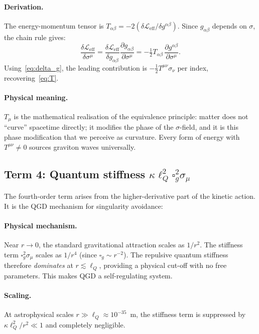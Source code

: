 \documentclass[11pt,a4paper]{article}
\theoremstyle{plain}
\theoremstyle{definition}
\theoremstyle{remark}
\newcommand{\lQ}{\ell_Q}
\newcommand{\boxg}{\square_g}
\newcommand{\half}{\tfrac{1}{2}}
\begin{document}
\paragraph{Derivation.}
The energy-momentum tensor is $T_{\alpha\beta} = -2(\delta\mathcal{L}_{\mathrm{eff}}/\delta g^{\alpha\beta})$.
Since $g_{\alpha\beta}$ depends on $\sigma$, the chain rule gives:
\[
  \frac{\delta\mathcal{L}_{\mathrm{eff}}}{\delta\sigma^\mu}
  = \frac{\delta\mathcal{L}_{\mathrm{eff}}}{\delta g_{\alpha\beta}}
    \frac{\partial g_{\alpha\beta}}{\partial\sigma^\mu}
  = -\half T_{\alpha\beta}\,\frac{\partial g^{\alpha\beta}}{\partial\sigma^\mu}.
\]
Using~\eqref{eq:delta_g}, the leading contribution is $-\half T^{\mu\nu}\sigma_\nu$ per
index, recovering~\eqref{eq:T}.

\paragraph{Physical meaning.}
$T_\mu$ is the mathematical realisation of the equivalence principle: matter does not
``curve'' spacetime directly; it modifies the phase of the $\sigma$-field, and it is
this phase modification that we perceive as curvature.  Every form of energy with
$T^{\mu\nu} \ne 0$ sources graviton waves universally.

\subsection{Term 4: Quantum stiffness $\kappa\lQ^2\boxg^2\sigma_\mu$}
\label{sec:stiffness}

The fourth-order term arises from the higher-derivative part of the kinetic action.
It is the QGD mechanism for singularity avoidance:

\paragraph{Physical mechanism.}
Near $r \to 0$, the standard gravitational attraction scales as $1/r^2$.  The stiffness
term $\boxg^2\sigma_\mu$ scales as $1/r^4$ (since $\boxg \sim r^{-2}$).
The repulsive quantum stiffness therefore \emph{dominates} at $r \lesssim \lQ$,
providing a physical cut-off with no free parameters.  This makes QGD a
self-regulating system.

\paragraph{Scaling.}
At astrophysical scales $r \gg \lQ \approx 10^{-35}$~m, the stiffness term is
suppressed by $\kappa\lQ^2/r^2 \ll 1$ and completely negligible.
\end{document}
